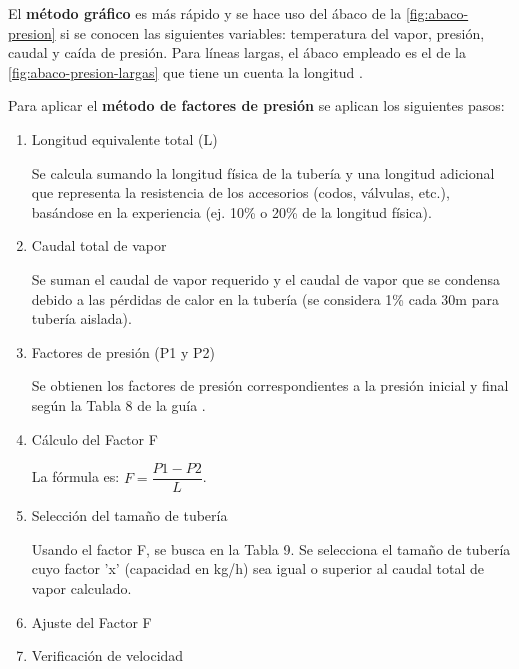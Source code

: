 \begin{itemize}
        El \textbf{método gráfico} es más rápido y se hace uso del ábaco de la \autoref{fig:abaco-presion} \parencite[pág. 17]{sarco-distribucion} si se conocen las siguientes variables: temperatura del vapor, presión, caudal y caída de presión. Para líneas largas, el ábaco empleado es el de la \autoref{fig:abaco-presion-largas} que tiene un cuenta la longitud \parencite[pág. 18]{sarco-distribucion}.

        Para aplicar el \textbf{método de factores de presión} se aplican los siguientes pasos:
        \begin{enumerate}
            \item Longitud equivalente total (L)
            
            Se calcula sumando la longitud física de la tubería y una longitud adicional que representa la resistencia de los accesorios (codos, válvulas, etc.), basándose en la experiencia (ej. 10\% o 20\% de la longitud física).
            
            \item Caudal total de vapor
            
            Se suman el caudal de vapor requerido y el caudal de vapor que se condensa debido a las pérdidas de calor en la tubería (se considera 1\% cada 30m para tubería aislada).
            
            \item Factores de presión (P1 y P2)
            
            Se obtienen los factores de presión correspondientes a la presión inicial y final según la Tabla 8 de la guía \parencite[pág. 57]{sarco-distribucion}.
            
            \item Cálculo del Factor F
            
            La fórmula es: $F = \dfrac{P1 - P2}{L}$.
            
            \item Selección del tamaño de tubería
            
            Usando el factor F, se busca en la Tabla 9. Se selecciona el tamaño de tubería cuyo factor 'x' (capacidad en kg/h) sea igual o superior al caudal total de vapor calculado.
            
            \item Ajuste del Factor F
            
            
            
            \item Verificación de velocidad
            

\end{enumerate}
\end{itemize}

